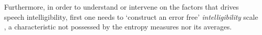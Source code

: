 Furthermore, in order to understand or intervene on the factors that drives speech intelligibility, first one needs to `construct an error free' \textit{intelligibility} scale \citep{Carroll_2006}, a characteristic not possessed by the entropy measures nor its averages.

\begin{comment}
			
	If you take a look at the research most of the time these phenomena are not really modelled as characteristics of persons, but as characteristics of smaller units of observation from that person (e.g. utterances; trials; …)
	
	Not approaching these phenomena as a ‘latent construct’ has statistical consequences (this is the crux of the problem; the statistical but also a conceptual problem)
	
	Second, although the literature suggest the number of (un)intelligible words or the entropy of transcriptions are scores that capture the level of intelligibility in a child, it is easy to notice these two can still be considered surrogate measures of it, i.e. scores that indirectly reflect what is intended to be measured. The latter is important because it implies these outcomes are `measured with error', resulting from considering that there is an unobserved (latent) `construct' that is responsible for the observed scores variation, i.e. the \textit{speech intelligibility}. Moreover, it is important to recognize that this `measurement error' is of a different kind that the one produced by the clustered nature of the data, and that again, by failing to account for it, we would be led to incorrect inferences \citep{deHaan_et_al_2019}.
	
	To the authors knowledge, no attempt to create such intelligibility latent 'construct' have been made. Therefore, we believe the literature could benefit from showing how to implement such procedure in a statistical model, in combination with the procedures needed to account for the other nuances in the data. 
	
	Third, even though the literature supplies a myriad of factors that are thought to contribute to the (under)development of intelligible spoken language \citep{Boons_et_al_2012, Gillis_2018, Fagan_et_al_2020, Niparko_et_al_2010}, no transparent framework of analysis is used to determine which factors are relevant, or conforms to valid and actionable causal hypothesis. The lack of such framework not only makes the selection and assessment of relevant factors harder, but also hinders the researcher's ability to avoid facing some common statistical issues related to such selection, e.g. determine which factors can be analyzed in tandem without facing collinearity problems, which ultimately affects our inference capabilities \citep{Farrar_et_al_1967}.
	

\end{comment}
